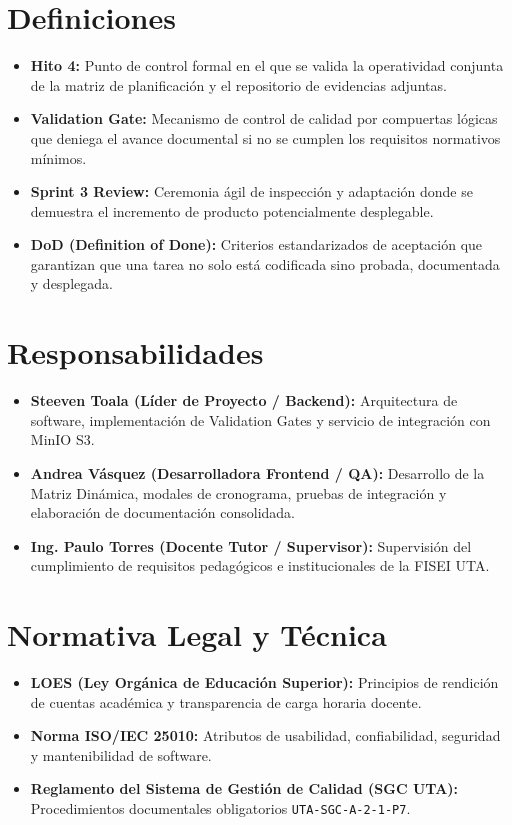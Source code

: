\documentclass[12pt,a4paper]{article}
\begin{document}
\section{Definiciones}
\begin{itemize}[leftmargin=1.5em, itemsep=1.5pt]
    \item \textbf{Hito 4:} Punto de control formal en el que se valida la operatividad conjunta de la matriz de planificación y el repositorio de evidencias adjuntas.
    \item \textbf{Validation Gate:} Mecanismo de control de calidad por compuertas lógicas que deniega el avance documental si no se cumplen los requisitos normativos mínimos.
    \item \textbf{Sprint 3 Review:} Ceremonia ágil de inspección y adaptación donde se demuestra el incremento de producto potencialmente desplegable.
    \item \textbf{DoD (Definition of Done):} Criterios estandarizados de aceptación que garantizan que una tarea no solo está codificada sino probada, documentada y desplegada.
\end{itemize}

\section{Responsabilidades}
\begin{itemize}[leftmargin=1.5em, itemsep=2pt]
    \item \textbf{Steeven Toala (Líder de Proyecto / Backend):} Arquitectura de software, implementación de Validation Gates y servicio de integración con MinIO S3.
    \item \textbf{Andrea Vásquez (Desarrolladora Frontend / QA):} Desarrollo de la Matriz Dinámica, modales de cronograma, pruebas de integración y elaboración de documentación consolidada.
    \item \textbf{Ing. Paulo Torres (Docente Tutor / Supervisor):} Supervisión del cumplimiento de requisitos pedagógicos e institucionales de la FISEI UTA.
\end{itemize}

\section{Normativa Legal y Técnica}
\begin{itemize}[leftmargin=1.5em, itemsep=1.5pt]
    \item \textbf{LOES (Ley Orgánica de Educación Superior):} Principios de rendición de cuentas académica y transparencia de carga horaria docente.
    \item \textbf{Norma ISO/IEC 25010:} Atributos de usabilidad, confiabilidad, seguridad y mantenibilidad de software.
    \item \textbf{Reglamento del Sistema de Gestión de Calidad (SGC UTA):} Procedimientos documentales obligatorios \texttt{UTA-SGC-A-2-1-P7}.
\end{itemize}
\end{document}
